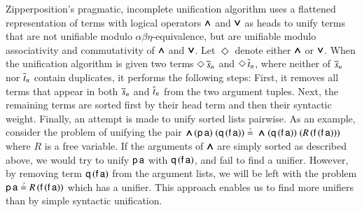 Zipperposition's pragmatic, incomplete unification algorithm 
uses a flattened representation of terms with logical operators $\pmb{\land}$ and $\pmb{\lor}$
as heads to unify terms that are not unifiable modulo $\alpha\beta\eta$-equivalence, but
are unifiable modulo associativity and commutativity of $\pmb{\land}$ and $\pmb{\lor}$. Let
$\Diamond$ denote either $\pmb{\land}$ or $\pmb{\lor}$. When the unification algorithm is given
two terms $\Diamond \, \overline{s}_{n}$ and $\Diamond \, \overline{t}_{n}$, where neither
of $\overline{s}_{n}$ nor $\overline{t}_{n}$ contain duplicates, it performs the
following steps: First, it removes all terms that appear in both
$\overline{s}_{n}$ and $\overline{t}_{n}$ from the two argument tuples.
Next, the remaining terms are sorted first by their head term and then their syntactic weight. Finally,
an attempt is made to unify sorted lists pairwise.
%
As an example, consider the problem of unifying the pair ${\iand} \,
(\cst{p} \, \cst{a}) \; (\cst{q} \, (\cst{f} \, \cst{a})) \unif \; {\iand} \;
(\cst{q} \, (\cst{f} \, \cst{a})) \; (R \, (\cst{f} \, (\cst{f} \,
\cst{a})))$ where $R$ is a free variable. If the arguments of $\pmb{\land}$ are
simply sorted as described above, we would try to unify $\mathsf{p} \, \mathsf{a}$
with $\mathsf{q} \, (\mathsf{f} \, \mathsf{a})$, and fail to find a unifier. However, by
removing term  $\mathsf{q} \, (\mathsf{f} \, \mathsf{a})$ from the argument lists, we
will be left with the problem $\cst{p} \, \cst{a} \unif  R \, (\cst{f} \, (\cst{f}
\, \cst{a}))$ which has a unifier. This approach enables us to find more unifiers
than by simple syntactic unification.

